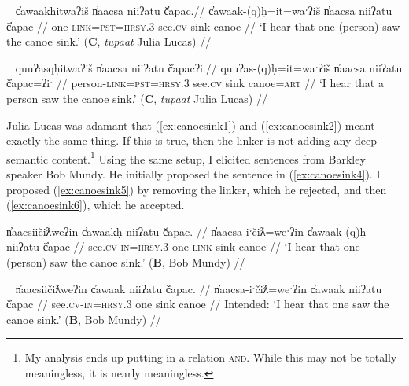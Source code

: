 \ex~ \label{ex:canoesink2}
\begingl
\glpreamble c̓awaakḥitwaʔiš n̓aacsa niiʔatu č̓apac.//
\gla c̓awaak-(q)ḥ=it=waˑʔiš n̓aacsa niiʔatu č̓apac //
\glb one-\textsc{link}=\textsc{pst}=\textsc{hrsy.3} see.\textsc{cv} sink canoe //
\glft `I hear that one (person) saw the canoe sink.' (\textbf{C}, \textit{tupaat} Julia Lucas) //
\endgl
\xe

\ex~ \label{ex:canoesink3}
\begingl
\glpreamble quuʔasqḥitwaʔiš n̓aacsa niiʔatu č̓apacʔi.//
\gla quuʔas-(q)ḥ=it=waˑʔiš n̓aacsa niiʔatu č̓apac=ʔiˑ //
\glb person-\textsc{link}=\textsc{pst}=\textsc{hrsy.3} see.\textsc{cv} sink canoe=\textsc{art} //
\glft `I hear that a person saw the canoe sink.' (\textbf{C}, \textit{tupaat} Julia Lucas) //
\endgl
\xe




Julia Lucas was adamant that (\ref{ex:canoesink1}) and (\ref{ex:canoesink2}) meant exactly the same thing. If this is true, then the linker is not adding any deep semantic content.\footnote{My analysis ends up putting in a relation \textsc{and}. While this may not be totally meaningless, it is nearly	 meaningless.} Using the same setup, I elicited sentences from Barkley speaker Bob Mundy. He initially proposed the sentence in (\ref{ex:canoesink4}). I proposed (\ref{ex:canoesink5}) by removing the linker, which he rejected, and then (\ref{ex:canoesink6}), which he accepted.

\ex \label{ex:canoesink4}
\begingl
\glpreamble n̓aacsiičiƛweʔin c̓awaakḥ niiʔatu č̓apac. //
\gla n̓aacsa-iˑčiƛ=weˑʔin c̓awaak-(q)ḥ niiʔatu č̓apac //
\glb see.\textsc{cv}-\textsc{in}=\textsc{hrsy.3} one-\textsc{link} sink canoe //
\glft `I hear that one (person) saw the canoe sink.' (\textbf{B}, Bob Mundy) //
\endgl
\xe

\ex~ \label{ex:canoesink5}
\begingl
\glpreamble *n̓aacsiičiƛweʔin c̓awaak niiʔatu č̓apac. //
\gla n̓aacsa-iˑčiƛ=weˑʔin c̓awaak niiʔatu č̓apac //
\glb see.\textsc{cv}-\textsc{in}=\textsc{hrsy.3} one sink canoe //
\glft Intended: `I hear that one saw the canoe sink.' (\textbf{B}, Bob Mundy) //
\endgl
\xe

